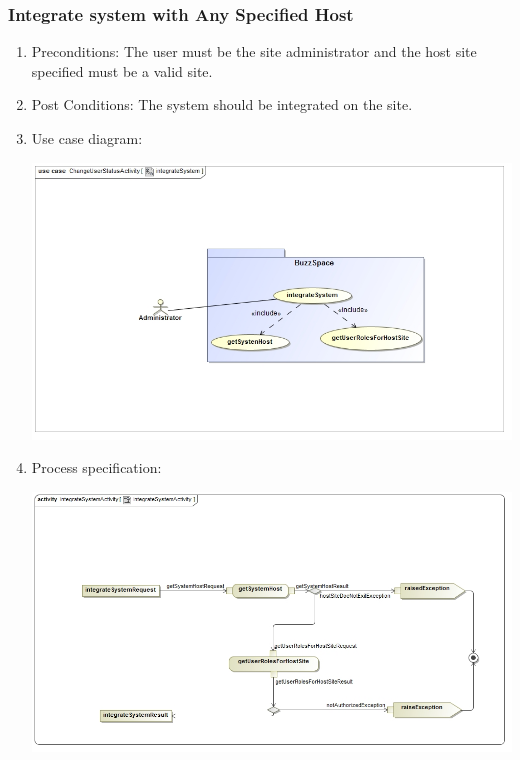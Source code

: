 \documentclass[hidelinks, 12pt, oneside]{article}
\begin{document}
\subsubsection{Integrate system with Any Specified Host}
\begin{enumerate}
\item Preconditions: The user must be the site administrator and the host site specified must be a valid site.
\item Post Conditions: The system should be integrated on the site.

\item Use case diagram:\\
\centerline{\includegraphics[scale=0.5]{integrateSystem.jpg}}
 \item Process specification:\\ 
\centerline{\includegraphics[scale=0.5]{integrateSystemActivity.jpg}}

\end{enumerate}
\end{document}
